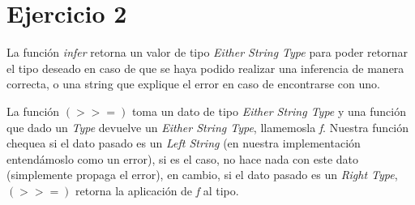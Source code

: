 \documentclass[11pt]{article}
\begin{document}
\section*{Ejercicio 2}

La función \textit{infer} retorna un valor de tipo \textit{Either String Type} para poder retornar el tipo deseado en caso de que se haya podido realizar una inferencia de manera correcta, o una string que explique el error en caso de encontrarse con uno. 

La función $(>>=)$ toma un dato de tipo \textit{Either String Type} y una función que dado un \textit{Type} devuelve un \textit{Either String Type}, llamemosla \textit{f}. Nuestra función chequea si el dato pasado es un \textit{Left String} (en nuestra implementación entendámoslo como un error), si es el caso, no hace nada con este dato (simplemente propaga el error), en cambio, si el dato pasado es un \textit{Right Type}, $(>>=)$ retorna la aplicación de \textit{f} al tipo.
\end{document}
